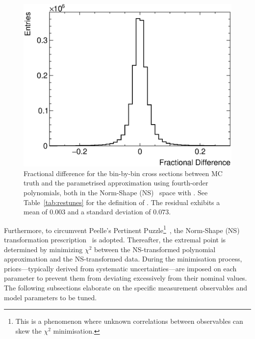 \begin{figure}[!htb] 	
    \centering 		
    \includegraphics[width=\sgfigwid\textwidth]{figures/tuning/residual.eps}
    \caption{\label{fig:residual} Fractional difference for the bin-by-bin cross sections between MC truth and the parametrised approximation using fourth-order polynomials, both in the Norm-Shape (NS)~\cite{DAgostini:1993arp,Hanson:2005mrg} space with \allpar. See Table~\ref{tab:restunes} for the definition of \allpar. The residual exhibits a mean of $0.003$ and a standard deviation of $0.073$.} 
\end{figure}

Furthermore, to circumvent Peelle's Pertinent Puzzle\footnote{This is a phenomenon where unknown correlations between observables can skew the $\chi^2$ minimisation.}~\cite{PPP_FNL,Chakrani:2023htw}, the Norm-Shape (NS) transformation prescription~\cite{DAgostini:1993arp,Hanson:2005mrg} is adopted. 
Thereafter, the extremal point is determined by minimizing $\chi^2$ between the NS-transformed polynomial approximation and the NS-transformed data. 
During the minimisation process, priors—typically derived from systematic uncertainties—are imposed on each parameter to prevent them from deviating excessively from their nominal values. 
The following subsections elaborate on the specific measurement observables and model parameters to be tuned.

